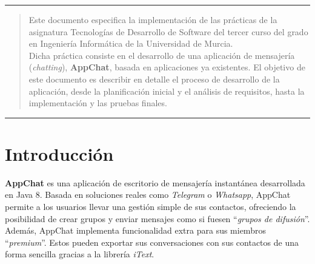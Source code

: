 \documentclass[11pt]{article}
\begin{document}
\date{\vspace{-10ex}}
\maketitle
\thispagestyle{empty} %
\clearpage

\thispagestyle{empty} %
\tableofcontents
\clearpage
\thispagestyle{empty} %
\listoffigures
\clearpage
\setcounter{page}{1}



\thispagestyle{empty}

\hrule
\vspace{-5.4ex}
\begin{abstract}
\vspace{1ex}
Este documento especifica la implementación de las prácticas de la asignatura Tecnologías de Desarrollo de Software del tercer curso del grado en Ingeniería Informática de la Universidad de Murcia.\\

Dicha práctica consiste en el desarrollo de una aplicación de mensajería (\textit{chatting}), \textbf{AppChat}, basada en aplicaciones ya existentes. El objetivo de este documento es describir en detalle el proceso de desarrollo de la aplicación, desde la planificación inicial y el análisis de requisitos, hasta la implementación y las pruebas finales.
\vspace{0.5ex}
\end{abstract}
\hrule
\vspace{4ex}

\section{Introducción}

\textbf{AppChat} es una aplicación de escritorio de mensajería instantánea desarrollada en Java 8. Basada en soluciones reales como \textit{Telegram} o \textit{Whatsapp}, AppChat permite a los usuarios llevar una gestión simple de sus contactos, ofreciendo la posibilidad de crear grupos y enviar mensajes como si fuesen ``\textit{grupos de difusión}''.\\

Además, AppChat implementa funcionalidad extra para sus miembros ``\textit{premium}''. Estos pueden exportar sus conversaciones con sus contactos de una forma sencilla gracias a la librería \textit{iText}.
\end{document}
